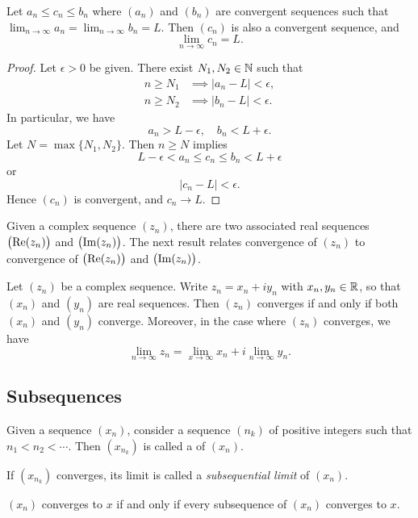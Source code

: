 \begin{proposition}
Let $a_n\le c_n\le b_n$ where $(a_n)$ and $(b_n)$ are convergent sequences such that $\displaystyle\lim_{n\to\infty}a_n=\lim_{n\to\infty}b_n=L$. Then $(c_n)$ is also a convergent sequence, and
\[\lim_{n\to\infty}c_n=L.\]
\end{proposition}

\begin{proof}
Let $\epsilon>0$ be given. There exist $N_1,N_2\in\mathbb N$ such that
\begin{align*}
n\ge N_1&\implies|a_n-L|<\epsilon,\\
n\ge N_2&\implies|b_n-L|<\epsilon.
\end{align*}
In particular, we have
\[a_n>L-\epsilon,\quad b_n<L+\epsilon.\]
Let $N=\max\{N_1,N_2\}$. Then $n\ge N$ implies
\[L-\epsilon<a_n\le c_n\le b_n<L+\epsilon\]
or
\[|c_n-L|<\epsilon.\]
Hence $(c_n)$ is convergent, and $c_n\to L$.
\end{proof}

Given a complex sequence $(z_n)$, there are two associated real sequences $\left(\Re(z_n)\right)$ and $\left(\Im(z_n)\right)$. The next result relates convergence of $(z_n)$ to convergence of $\left(\Re(z_n)\right)$ and $\left(\Im(z_n)\right)$.

\begin{proposition}
Let $(z_n)$ be a complex sequence. Write $z_n=x_n+iy_n$ with $x_n,y_n\in\mathbb R$, so that $(x_n)$ and $(y_n)$ are real sequences. Then $(z_n)$ converges if and only if both $(x_n)$ and $(y_n)$ converge. Moreover, in the case where $(z_n)$ converges, we have
\[\lim_{n\to\infty}z_n=\lim_{x\to\infty}x_n+i\lim_{n\to\infty}y_n.\]
\end{proposition}
\pagebreak

\subsection{Subsequences}
\begin{definition}[Subsequence]
Given a sequence $(x_n)$, consider a sequence $(n_k)$ of positive integers such that $n_1<n_2<\cdots$. Then $(x_{n_k})$ is called a  of $(x_n)$.

If $(x_{n_k})$ converges, its limit is called a \emph{subsequential limit} of $(x_n)$.
\end{definition}

\begin{proposition}
$(x_n)$ converges to $x$ if and only if every subsequence of $(x_n)$ converges to $x$.
\end{proposition}

